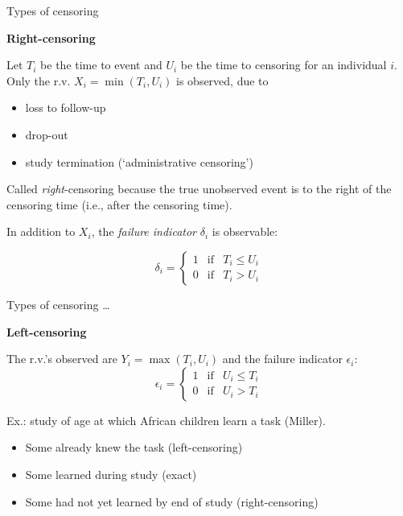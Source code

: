 \documentclass[ignorenonframetext,]{beamer}
\providecommand{\tightlist}{%
  \setlength{\itemsep}{0pt}\setlength{\parskip}{0pt}}
\begin{document}
\begin{frame}{%
\protect\hypertarget{types-of-censoring}{%
Types of censoring}}

\textbf{Right-censoring}

Let \(T_i\) be the time to event and \(U_i\) be the time to censoring
for an individual \(i\). Only the r.v. \(X_i=\min(T_i,U_i)\) is
observed, due to

\begin{itemize}
\tightlist
\item
  loss to follow-up
\item
  drop-out
\item
  study termination (`administrative censoring’)
\end{itemize}

Called \emph{right}-censoring because the true unobserved event is to
the right of the censoring time (i.e., after the censoring time).

In addition to \(X_i\), the \emph{failure indicator} \(\delta_i\) is
observable:

\[\delta_i=\left\{\begin{array}{ccc}
1 & \mbox{if} & T_i\le U_i \\
0 & \mbox{if} & T_i>U_i \end{array} \right. \]

\end{frame}

\begin{frame}{%
\protect\hypertarget{types-of-censoring-1}{%
Types of censoring \ldots}}

\textbf{Left-censoring}

The r.v.’s observed are \(Y_i=\max(T_i,U_i)\) and the failure indicator
\(\epsilon_i\): \[\epsilon_i=\left\{\begin{array}{ccc}
1 & \mbox{if} & U_i\le T_i \\
0 & \mbox{if} & U_i>T_i \end{array} \right. \]

Ex.: study of age at which African children learn a task (Miller).

\begin{itemize}
\tightlist
\item
  Some already knew the task (left-censoring)
\item
  Some learned during study (exact)
\item
  Some had not yet learned by end of study (right-censoring)
\end{itemize}

\end{frame}
\end{document}
